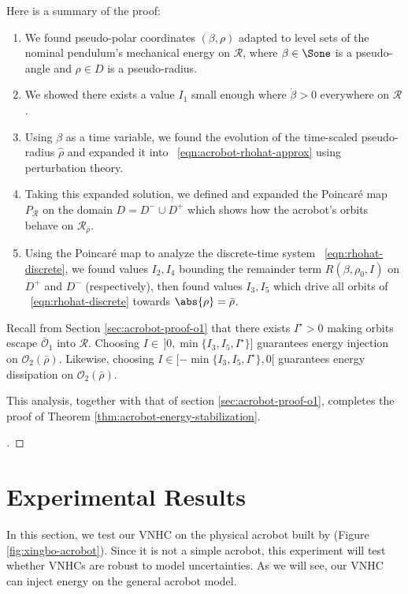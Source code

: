 Here is a summary of the proof:
\begin{enumerate}
    \item We found pseudo-polar coordinates \((\beta,\rho)\) adapted to level
        sets of the nominal pendulum's mechanical energy on \(\mathcal{R}\),
        where \(\beta \in \Sone\) is a pseudo-angle and
        \(\rho \in D\) is a pseudo-radius.
    \item We showed there exists a value \(I_1\) small enough where
        \(\dot{\beta} > 0\) everywhere on \(\mathcal{R}\).
    \item Using \(\beta\) as a time variable, we found the evolution of the
        time-scaled pseudo-radius \(\hat{\rho}\) and expanded it into
        ~\eqref{eqn:acrobot-rhohat-approx} using perturbation theory.
    \item Taking this expanded solution, we defined and expanded the
        Poincar\'{e} map \(P_\mathcal{R}\) on the domain 
        \(D = D^- \cup D^+\) which shows how the acrobot's orbits behave on
        \(\mathcal{R}_{\bar{\rho}}\).
    \item Using the Poincar\'{e} map to analyze the discrete-time system
        ~\eqref{eqn:rhohat-discrete}, we found values \(I_2,I_4\) bounding the
        remainder term \(R(\beta,\rho_0,I)\) on \(D^+\) and \(D^-\)
        (respectively), then found values \(I_3, I_5\) which drive all orbits of
        ~\eqref{eqn:rhohat-discrete} towards \(\abs{\rho} = \bar{\rho}\).
\end{enumerate}
Recall from Section \ref{sec:acrobot-proof-o1} that there exists \(I^\star > 0\)
making orbits escape \(\bar{\mathcal{O}}_1\) into 
\(\mathcal{R}\). 
Choosing \(I \in \,]0,\min\{I_3,I_5,I^\star\}]\)
guarantees energy injection on \(\mathcal{O}_2(\bar{\rho})\).
Likewise, choosing \(I \in [-\min\{I_3,I_5,I^\star\},0[\) guarantees energy
dissipation on \(\mathcal{O}_2(\bar{\rho})\).

This analysis, together with that of section \ref{sec:acrobot-proof-o1},
completes the proof of Theorem \ref{thm:acrobot-energy-stabilization}.

\begin{proof}[\unskip\nopunct]
\end{proof}

\section{Experimental Results}
In this section, we test our VNHC on the physical acrobot built by
\citet{xingbo_thesis} (Figure \ref{fig:xingbo-acrobot}).
Since it is not a simple acrobot, this experiment will test whether VNHCs are
robust to model uncertainties.
As we will see, our VNHC can inject energy on the general acrobot model.

